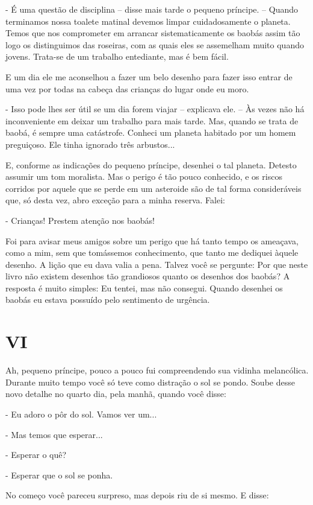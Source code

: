 - É uma questão de disciplina -- disse mais tarde o pequeno príncipe. --
Quando terminamos nossa toalete matinal devemos limpar cuidadosamente o
planeta. Temos que nos comprometer em arrancar sistematicamente os
baobás assim tão logo os distinguimos das roseiras, com as quais eles se
assemelham muito quando jovens. Trata-se de um trabalho entediante, mas
é bem fácil.

E um dia ele me aconselhou a fazer um belo desenho para fazer isso
entrar de uma vez por todas na cabeça das crianças do lugar onde eu
moro.

- Isso pode lhes ser útil se um dia forem viajar -- explicava ele. -- Às
vezes não há inconveniente em deixar um trabalho para mais tarde. Mas,
quando se trata de baobá, é sempre uma catástrofe. Conheci um planeta
habitado por um homem preguiçoso. Ele tinha ignorado três arbustos...

E, conforme as indicações do pequeno príncipe, desenhei o tal planeta.
Detesto assumir um tom moralista. Mas o perigo é tão pouco conhecido, e
os riscos corridos por aquele que se perde em um asteroide são de tal
forma consideráveis que, só desta vez, abro exceção para a minha
reserva. Falei:

- Crianças! Prestem atenção nos baobás!

Foi para avisar meus amigos sobre um perigo que há tanto tempo os
ameaçava, como a mim, sem que tomássemos conhecimento, que tanto me
dediquei àquele desenho. A lição que eu dava valia a pena. Talvez você
se pergunte: Por que neste livro não existem desenhos tão grandiosos
quanto os desenhos dos baobás? A resposta é muito simples: Eu tentei,
mas não consegui. Quando desenhei os baobás eu estava possuído pelo
sentimento de urgência.

\chapter{VI}

Ah, pequeno príncipe, pouco a pouco fui compreendendo sua vidinha
melancólica. Durante muito tempo você só teve como distração o sol se
pondo. Soube desse novo detalhe no quarto dia, pela manhã, quando você
disse:

- Eu adoro o pôr do sol. Vamos ver um...

- Mas temos que esperar...

- Esperar o quê?

- Esperar que o sol se ponha.

No começo você pareceu surpreso, mas depois riu de si mesmo. E disse:

